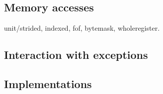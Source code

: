 \subsection{Memory accesses}
unit/strided,
indexed,
fof,
bytemask,
wholeregister.

\subsection{Interaction with exceptions}

\subsection{Implementations}